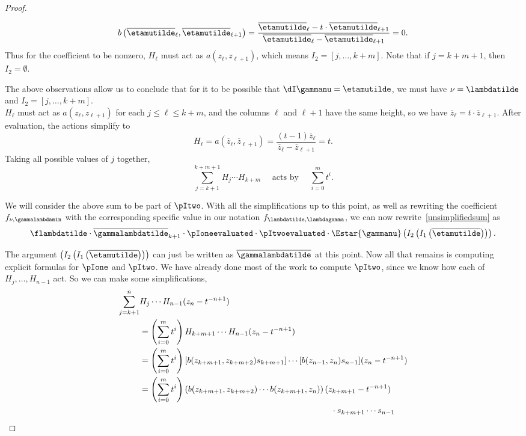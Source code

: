 \begin{proof}
\begin{itemize}
    \[b\left(\overline{\etamutilde}_{\ell}, \overline{\etamutilde}_{\ell+1} \right) =\frac{\overline{\etamutilde}_\ell- t\cdot \overline{\etamutilde}_{\ell+1}}{\overline{\etamutilde}_\ell- \overline{\etamutilde}_{\ell+1}} = 0.\] Thus for the coefficient to be nonzero, $H_\ell$ must act as $a(z_\ell,z_{\ell+1})$, which means $I_2 = [j, \dotsc, k+m]$. Note that if $j=k+m+1$, then $I_2 = \emptyset$.
\end{itemize}



The above observations allow us to conclude that for it to be possible that $\dI \gammanu = \etamutilde$, we must have $\nu = \lambdatilde$ and $I_2 = [j, \dotsc, k+m]$. \\

$H_\ell$ must act as $a(z_\ell,z_{\ell+1})$ for each $j \leq \ell \leq k+m$, and the columns $\ell$ and $\ell+1$ have the same height, so we have $\overline{z}_\ell=t\cdot \overline{z}_{\ell+1}$. After evaluation, the actions simplify to
\[ H_\ell = a(\overline{z}_\ell, \overline{z}_{\ell+1}) = \frac{(t-1) \overline{z}_\ell}{\overline{z}_\ell-\overline{z}_{\ell+1}} = t.\]
Taking all possible values of $j$ together,
\[ \sum_{j={k+1}}^{k+m+1} H_j \dotsm H_{k+m}\quad  \text{ acts by }\quad \sum_{i=0}^{m} t^i.\]

We will consider the above sum to be part of $\pItwo$. With all the simplifications up to this point, as well as rewriting the coefficient $f_{\nu, \gammalambdamin}$ with the corresponding specific value in our notation $f_{\lambdatilde, \lambdagamma}$, we can now rewrite~\eqref{unsimplifiedsum} as
\[ \flambdatilde \cdot \overline{\gammalambdatilde}_{k+1} \cdot    \pIoneevaluated \cdot \pItwoevaluated \cdot \Estar{\gammanu}\left(I_2\left(I_1\left(\overline{\etamutilde}\right)\right)\right).\]

The argument $\left(I_2\left(I_1\left(\overline{\etamutilde}\right)\right) \right)$ can just be written as $\overline{\gammalambdatilde}$ at this point. Now all that remains is computing explicit formulas for $\pIone$ and $\pItwo$. We have already done most of the work to compute $\pItwo$, since we know how each of $H_j,\dots, H_{n-1}$ act. So we can make some simplifications, \begin{align*}\sum_{j=k+1}^n &H_j \dotsm H_{n-1}(z_n-t^{-n+1})\\
  &= \left( \sum_{i=0}^{m} t^i \right) H_{k+m+1} \dotsm H_{n-1} (z_n-t^{-n+1}) \\
&= \left( \sum_{i=0}^{m} t^i \right)[b(z_{k+m+1},z_{k+m+2}) s_{k+m+1}] \dotsm [b(z_{n-1},z_n) s_{n-1}](z_n-t^{-n+1}) \\
&= \left( \sum_{i=0}^{m} t^i \right)\left(b(z_{k+m+1},z_{k+m+2}) \dotsm b(z_{k+m+1}, z_{n})\right) (z_{k+m+1}-t^{-n+1}) \\ &\hspace*{8cm} \cdot s_{k+m+1} \dotsm s_{n-1}\end{align*}


\end{proof}
